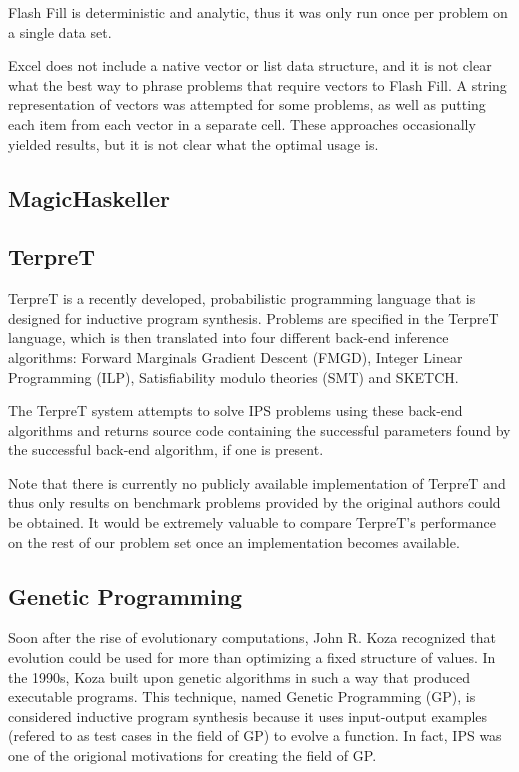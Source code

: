 Flash Fill is deterministic and analytic, thus it was only run once per problem on a single data set.

Excel does not include a native vector or list data structure, and it is not clear what the best way to phrase problems that require vectors to Flash Fill. A string representation of vectors was attempted for some problems, as well as putting each item from each vector in a separate cell. These approaches occasionally yielded results, but it is not clear what the optimal usage is.

\subsection{MagicHaskeller}


\subsection{TerpreT}

TerpreT is a recently developed, probabilistic programming language that is designed for inductive program synthesis. Problems are specified in the TerpreT language, which is then translated into four different back-end inference algorithms: Forward Marginals Gradient Descent (FMGD), Integer Linear Programming (ILP), Satisfiability modulo theories (SMT) and SKETCH.

The TerpreT system attempts to solve IPS problems using these back-end algorithms and returns source code containing the successful parameters found by the successful back-end algorithm, if one is present.

Note that there is currently no publicly available implementation of TerpreT and thus only results on benchmark problems provided by the original authors could be obtained. It would be extremely valuable to compare TerpreT's performance on the rest of our problem set once an implementation becomes available.


\subsection{Genetic Programming}

Soon after the rise of evolutionary computations, John R. Koza recognized that evolution could be used for more than optimizing a fixed structure of values. In the 1990s, Koza built upon genetic algorithms in such a way that produced executable programs. This technique, named Genetic Programming (GP), is considered inductive program synthesis because it uses input-output examples (refered to as test cases in the field of GP) to evolve a function. In fact, IPS was one of the origional motivations for creating the field of GP\cite{Koza1992}. 

